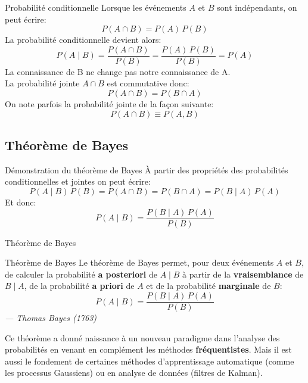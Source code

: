 \documentclass[10pt]{beamer}  %
\begin{document}
\begin{frame}{Probabilité conditionnelle}
	Lorsque les événements $A$ et $B$ sont indépendants, on peut écrire:
	\begin{equation}
		P(A \cap B) = P(A) \, P(B)
		\nonumber
	\end{equation}
	\pause
	La probabilité conditionnelle devient alors:
	\begin{equation}
		P(A \mid B) = \displaystyle \frac{P(A \cap B)}{P(B)} = \displaystyle \frac{P(A) \, P(B)}{P(B)} = P(A)
		\nonumber
	\end{equation}
	La connaissance de B ne change pas notre connaissance de A. \\
	\pause
	\vspace{0.3cm}
	La probabilité jointe $A \cap B$ est commutative donc:
	\begin{equation}
		P(A \cap B) = P(B \cap A)
		\nonumber
	\end{equation}
	\pause
	On note parfois la probabilité jointe de la façon suivante:
	\begin{equation}
		P(A \cap B) \equiv P(A, B)
		\nonumber
	\end{equation}
\end{frame}

\subsection{Théorème de Bayes}

\begin{frame}{Démonstration du théorème de Bayes}
	\`A partir des propriétés des probabilités conditionnelles et jointes on peut écrire:
	\begin{equation}
		P(A \mid B) \, P(B) = P(A \cap B) = P(B \cap A) = P(B \mid A) \, P(A)
		\nonumber
	\end{equation}
	Et donc:
	\begin{equation}
		P(A \mid B) = \frac{P(B \mid A) \, P(A)}{P(B)}
		\nonumber
	\end{equation}
\end{frame}

\begin{frame}{Théorème de Bayes}
	\begin{block}{Théorème de Bayes}
		Le théorème de Bayes permet, pour deux événements $A$ et $B$, de calculer la probabilité \textbf{a posteriori} de $A \mid B$ à partir de la \textbf{vraisemblance} de $B \mid A$, de la probabilité \textbf{a priori} de $A$ et de la probabilité \textbf{marginale} de $B$:
		\begin{equation}
			P(A \mid B) = \displaystyle \frac{P(B \mid A) \, P(A)}{P(B)}
			\nonumber
		\end{equation}
		\hfill
		\textit{--- Thomas Bayes (1763)}
	\end{block}
	\pause
	Ce théorème a donné naissance à un nouveau paradigme dans l'analyse des probabilités en venant en complément les méthodes \textbf{fréquentistes}. Mais il est aussi le fondement de certaines méthodes d'apprentissage automatique (comme les processus Gaussiens) ou en analyse de données (filtres de Kalman). 
\end{frame}
\end{document}
